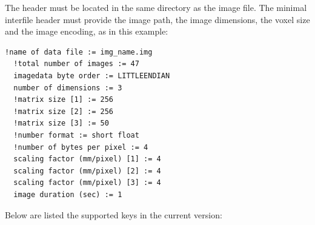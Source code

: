 \documentclass[a4paper, 11pt]{article}
\begin{document}
The header must be located in the same directory as the image file. The minimal interfile header must provide the image path, the image dimensions, the
voxel size and the image encoding, as in this example:

\begin{lstlisting}[label={intf3D},caption= Interfile header mandatory keys for reading]
  !name of data file := img_name.img
  !total number of images := 47
  imagedata byte order := LITTLEENDIAN
  number of dimensions := 3
  !matrix size [1] := 256
  !matrix size [2] := 256
  !matrix size [3] := 50
  !number format := short float
  !number of bytes per pixel := 4
  scaling factor (mm/pixel) [1] := 4
  scaling factor (mm/pixel) [2] := 4
  scaling factor (mm/pixel) [3] := 4
  image duration (sec) := 1
\end{lstlisting}
 
Below are listed the supported keys in the current version:
\end{document}
